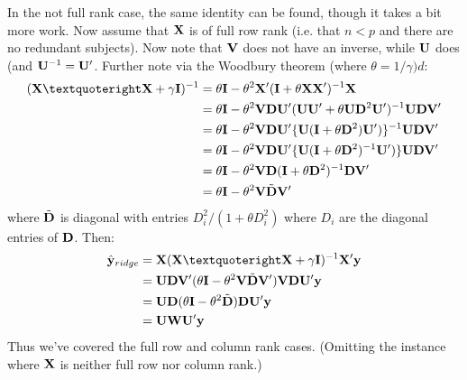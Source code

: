 In the not full rank case, the same identity can be found, though it takes a bit more work. Now assume
that $\mathbf{X}$ is of full row rank (i.e. that $n < p$ and there are no redundant subjects). Now note that
$\mathbf{V}$ does not have an inverse, while $\mathbf{U}$ does (and $\mathbf{U}^{-1} = \mathbf{U}'$. Further note via
the Woodbury theorem (where $\theta = 1/\gamma)d$:
\begin{align*}
(\xtx + \gamma \bI)^{-1} & = 
\theta \bI - \theta^2 \bX' (\bI + \theta \bX \bX')^{-1} \bX \\
& = \theta \bI - \theta^2 \bV \bD \bU'  (\bU \bU' + \theta \bU \bD^2 \bU')^{-1} \bU \bD \bV' \\
& = \theta \bI - \theta^2 \bV \bD \bU' \{\bU(\bI + \theta \bD^2) \bU')\}^{-1} \bU \bD \bV' \\
& = \theta \bI - \theta^2 \bV \bD \bU' \{\bU(\bI + \theta \bD^2)^{-1} \bU')\} \bU \bD \bV' \\ 
& = \theta \bI - \theta^2 \bV \bD (\bI + \theta \bD^2)^{-1} \bD \bV' \\
& = \theta \bI - \theta^2 \bV \tilde \bD \bV' 
\end{align*}
where $\tilde {\mathbf{D}}$ is diagonal with entries $D_i^2 / (1 + \theta D_i^2)$ where $D_i$ are the 
diagonal entries of $\mathbf{D}$. Then:
\begin{align*}
\hat \by_{ridge} 
& = \bX (\xtx + \gamma \bI)^{-1} \bX' \by  \\
& = \bU \bD \bV' (\theta \bI - \theta^2 \bV \tilde \bD \bV') \bV \bD \bU' \by \\
& = \bU \bD (\theta \bI - \theta^2 \tilde \bD)\bD \bU' \by \\
& = \bU \bW \bU' \by
\end{align*}
Thus we've covered the full row and column rank cases. (Omitting the instance where $\mathbf{X}$ is neither
full row nor column rank.)



